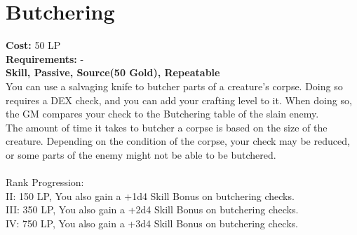\section{Butchering}\label{perk:butchering}
\textbf{Cost:} 50 LP\\
\textbf{Requirements:} -\\
\textbf{Skill, Passive, Source(50 Gold), Repeatable}\\
You can use a salvaging knife to butcher parts of a creature's corpse.
Doing so requires a DEX check, and you can add your crafting level to it.
When doing so, the GM compares your check to the Butchering table of the slain enemy.\\
The amount of time it takes to butcher a corpse is based on the size of the creature.
Depending on the condition of the corpse, your check may be reduced, or some parts of the enemy might not be able to be butchered.\\
\\
Rank Progression:\\
II: 150 LP, You also gain a +1d4 Skill Bonus on butchering checks.\\
III: 350 LP, You also gain a +2d4 Skill Bonus on butchering checks.\\
IV: 750 LP, You also gain a +3d4 Skill Bonus on butchering checks.\\